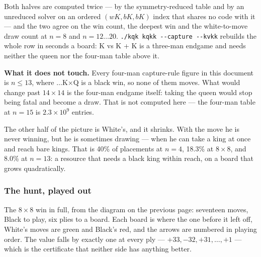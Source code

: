 \documentclass[11pt]{article}
\begin{document}
\smallskip
\noindent
Both halves are computed twice --- by the symmetry-reduced table and by an
unreduced solver on an ordered $(wK, bK, bK)$ index that shares no code with
it --- and the two agree on the win count, the deepest win and the
white-to-move draw count at $n=8$ and $n=12\ldots20$.
\texttt{./kqk kqkk -{}-capture -{}-kvkk} rebuilds the whole row in seconds a
board: K vs K + K is a three-man endgame and needs neither the queen nor the
four-man table above it.

\smallskip
\noindent
\textbf{What it does not touch.} Every four-man capture-rule figure in this
document is $n \le 13$, where $\ldots$K$\times$Q is a black win, so none of them
moves. What would change past $14\times14$ is the four-man endgame itself:
taking the queen would stop being fatal and become a draw. That is not computed
here --- the four-man table at $n=15$ is $2.3\times10^9$ entries.

The other half of the picture is White's, and it shrinks. With the move he is
never winning, but he is sometimes drawing --- when he can take a king at once
and reach bare kings. That is 40\% of placements at $n=4$, 18.3\% at
$8\times8$, and 8.0\% at $n=13$: a resource that needs a black king within
reach, on a board that grows quadratically.

\clearpage
\subsubsection{The hunt, played out}\label{sub:cap-hunt-played}

\noindent
The $8\times8$ win in full, from the diagram on the previous page: seventeen
moves, Black to play, six plies to a board. Each board is where the one before
it left off, White's moves are green and Black's red, and the arrows are
numbered in playing order. The value falls by exactly one at every ply ---
$+33, -32, +31, \ldots, +1$ --- which is the certificate that neither side has
anything better.

\smallskip
\end{document}
